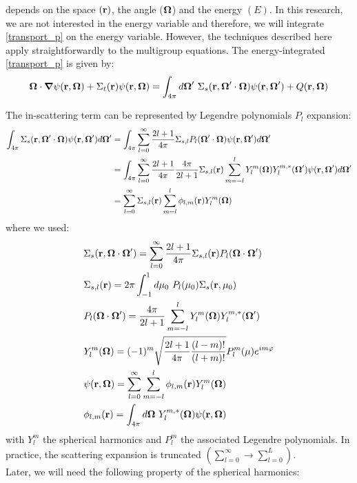  depends on the space $(\mathbf{r})$, the angle ($\boldsymbol{\Omega}$) and the
energy $(E)$. In this research, we are not interested in the energy variable
and therefore, we will integrate \cref{transport_p} on the energy variable. 
However, the techniques described here apply straightforwardly to the multigroup 
equations. The energy-integrated \cref{transport_p} is given by:
\begin{equation}
\bo\cdot \bn \psi(\br,\bo) + \Sigma_t(\br)\psi(\br,\bo) =
\int_{4\pi}d\bo'\ \Sigma_s(\br,\bo'\cdot\bo)\psi(\br,\bo')+Q(\br,\bo)
\label{transport_p2}
\end{equation}

The in-scattering term can be represented by Legendre polynomials $P_l$ expansion:
\begin{equation}
\begin{split}
\int_{4\pi} \Sigma_s(\mathbf{r},\boldsymbol{\Omega}'\cdot\boldsymbol{\Omega}) \psi(\mathbf{r},\boldsymbol{\Omega}') d\boldsymbol{\Omega}' &=
\int_{4\pi} \sum_{l=0}^{\infty} \frac{2l+1}{4\pi} \Sigma_{s,l} P_l(\boldsymbol{\Omega}'\cdot\boldsymbol{\Omega})
\psi(\mathbf{r},\boldsymbol{\Omega}') d\boldsymbol{\Omega}'\\
&= \int_{4\pi} \sum_{l=0}^{\infty} \frac{2l+1}{4\pi}\frac{4\pi}{2l+1}
\Sigma_{s,l}(\mathbf{r}) \sum_{m=-l}^{l} Y_l^m(\boldsymbol{\Omega})Y_l^{m,*}(\boldsymbol{\Omega}') \psi(\mathbf{r},\boldsymbol{\Omega}')d\boldsymbol{\Omega}'\\
&= \sum_{l=0}^{\infty} \Sigma_{s,l}(\mathbf{r}) \sum_{m=l}^l \phi_{l,m}(\mathbf{r})
Y_l^m(\boldsymbol{\Omega})
\end{split}
\end{equation}
where we used:
\begin{align}
&\Sigma_s(\br,\bo\cdot\bo') = \sum_{l=0}^{\infty} \frac{2l+1}{4\pi}
\Sigma_{s,l}(\br) P_l(\bo\cdot\bo')\\
&\Sigma_{s,l}(\br) = 2\pi \int_{-1}^1 d\mu_0\ P_l(\mu_0) \Sigma_s(\br,\mu_0)\\
& P_l(\bo\cdot\bo') = \frac{4\pi}{2l+1} \sum_{m=-l}^l
Y_l^m(\bo)Y_l^{m,*}(\bo')\\
& Y_l^m(\bo) = (-1)^m \sqrt{\frac{2l+1}{4\pi} \frac{(l-m)!}{(l+m)!}} P_l^m(\mu)
e^{im\varphi}\\
&\psi(\br,\bo) = \sum_{l=0}^{\infty}\sum_{m=-l}^l \phi_{l,m}(\br) Y_l^m(\bo)
\label{ang_flux}\\
&\phi_{l,m}(\br) = \int_{4\pi} d\bo\ Y_{l}^{m,*}(\bo) \psi(\br,\bo)
\label{moments}
\end{align}
with $Y_l^m$ the spherical harmonics and $P_l^m$ the associated
Legendre polynomials. In practice, the scattering expansion is truncated 
$(\sum_{l=0}^{\infty}\rightarrow \sum_{l=0}^L)$.\\
Later, we will need the following property of the spherical harmonics:
